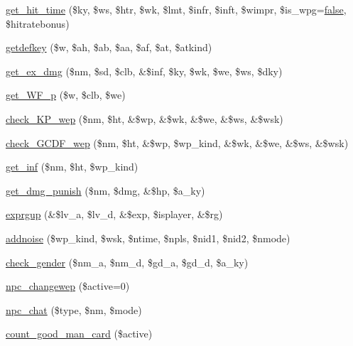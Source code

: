 \begin{DoxyCompactItemize}
\hyperlink{combat_8func_8php_a1e377ee46415a5395f86fc560f848386}{get\+\_\+hit\+\_\+time} (\$ky, \$ws, \$htr, \$wk, \$lmt, \$infr, \$inft, \$wimpr, \$is\+\_\+wpg=\hyperlink{1__chat_8tpl_8php_a5df37b7f02e5cdc7d9412b7f872b8e01}{false}, \$hitratebonus)
\item 
\hyperlink{combat_8func_8php_a2d69527972c1cfd87b597db32ca756ef}{getdefkey} (\$w, \$ah, \$ab, \$aa, \$af, \$at, \$atkind)
\item 
\hyperlink{combat_8func_8php_ab67f6afe7c5805c0e52d1a42abc46b28}{get\+\_\+ex\+\_\+dmg} (\$nm, \$sd, \$clb, \&\$inf, \$ky, \$wk, \$we, \$ws, \$dky)
\item 
\hyperlink{combat_8func_8php_abffdd2bf66528baeeabdb9643d5299e0}{get\+\_\+\+W\+F\+\_\+p} (\$w, \$clb, \$we)
\item 
\hyperlink{combat_8func_8php_a2a624591ca80156bf6bc72a85737eb7c}{check\+\_\+\+K\+P\+\_\+wep} (\$nm, \$ht, \&\$wp, \&\$wk, \&\$we, \&\$ws, \&\$wsk)
\item 
\hyperlink{combat_8func_8php_a3e6702aca006e9cd4800f503badf5f5d}{check\+\_\+\+G\+C\+D\+F\+\_\+wep} (\$nm, \$ht, \&\$wp, \$wp\+\_\+kind, \&\$wk, \&\$we, \&\$ws, \&\$wsk)
\item 
\hyperlink{combat_8func_8php_a8000f1ffc6ec8b5679d67cf003cd037c}{get\+\_\+inf} (\$nm, \$ht, \$wp\+\_\+kind)
\item 
\hyperlink{combat_8func_8php_a215852208faf54b9216907f090058b4f}{get\+\_\+dmg\+\_\+punish} (\$nm, \$dmg, \&\$hp, \$a\+\_\+ky)
\item 
\hyperlink{combat_8func_8php_a22d545565de904e187ae4bf9fc087b8a}{exprgup} (\&\$lv\+\_\+a, \$lv\+\_\+d, \&\$exp, \$isplayer, \&\$rg)
\item 
\hyperlink{combat_8func_8php_aea341f2375962bf9859911e269f3a7c3}{addnoise} (\$wp\+\_\+kind, \$wsk, \$ntime, \$npls, \$nid1, \$nid2, \$nmode)
\item 
\hyperlink{combat_8func_8php_a578f3cb38d83e0bc71638578d0142ae0}{check\+\_\+gender} (\$nm\+\_\+a, \$nm\+\_\+d, \$gd\+\_\+a, \$gd\+\_\+d, \$a\+\_\+ky)
\item 
\hyperlink{combat_8func_8php_a9efb23dd3a2b37dc893af1facac62ab1}{npc\+\_\+changewep} (\$active=0)
\item 
\hyperlink{combat_8func_8php_af6fcc6c379a36fa1ebe3070d3b50d2aa}{npc\+\_\+chat} (\$type, \$nm, \$mode)
\item 
\hyperlink{combat_8func_8php_accb7038d440fcc9fd6edde10e2f5bc2c}{count\+\_\+good\+\_\+man\+\_\+card} (\$active)
\end{DoxyCompactItemize}


